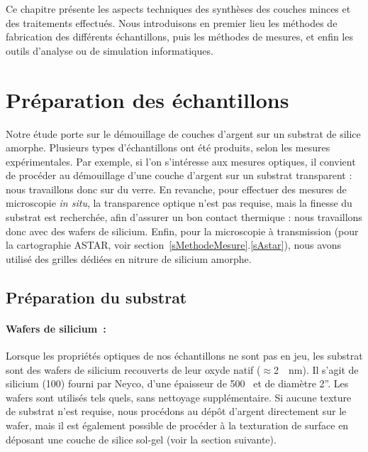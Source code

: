 \newpage\null\thispagestyle{empty}\newpage
\minitoc
\newpage

Ce chapitre présente les aspects techniques des synthèses des couches minces et des traitements effectués. Nous introduisons en premier lieu les méthodes de fabrication des différents échantillons, puis les méthodes de mesures, et enfin les outils d'analyse ou de simulation informatiques.\par 

\section{Préparation des échantillons}
Notre étude porte sur le démouillage de couches d'argent sur un substrat de silice amorphe. Plusieurs types d'échantillons ont été produits, selon les mesures expérimentales. Par exemple, si l'on s'intéresse aux mesures optiques, il convient de procéder au démouillage d'une couche d'argent sur un substrat transparent : nous travaillons donc sur du verre. En revanche, pour effectuer des mesures de microscopie \textit{in situ}, la transparence optique n'est pas requise, mais la finesse du substrat est recherchée, afin d'assurer un bon contact thermique : nous travaillons donc avec des wafers de silicium. Enfin, pour la microscopie à transmission (pour la cartographie ASTAR, voir section~\ref{sMethodeMesure}.\ref{sAstar}), nous avons utilisé des grilles dédiées en nitrure de silicium amorphe.\par 

	\subsection{Préparation du substrat}
\paragraph*{Wafers de silicium~:} Lorsque les propriétés optiques de nos échantillons ne sont pas en jeu, les substrat sont des wafers de silicium recouverts de leur oxyde natif ($\approx$2~~nm). Il s'agit de silicium (100) fourni par Neyco, d'une épaisseur de 500~\micro\meter{} et de diamètre 2”. Les wafers sont utilisés tels quels, sans nettoyage supplémentaire. Si aucune texture de substrat n'est requise, nous procédons au dépôt d'argent directement sur le wafer, mais il est également possible de procéder à la texturation de surface en déposant une couche de silice sol-gel (voir la section suivante).\par 

